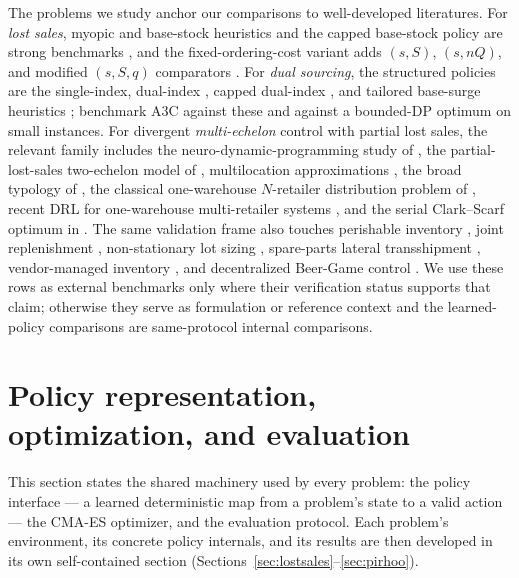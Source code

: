 \documentclass[11pt]{article}
\begin{document}
The problems we study anchor our comparisons to well-developed literatures. For \emph{lost sales},
myopic and base-stock heuristics and the capped base-stock policy are strong benchmarks
\citep{Zipkin2008OldSystems,Xin2021CappedBaseStock}, and the fixed-ordering-cost variant adds
$(s,S)$, $(s,nQ)$, and modified $(s,S,q)$ comparators \citep{Bijvank2015ParametricPolicies}. For
\emph{dual sourcing}, the structured policies are the single-index, dual-index
\citep{veeraraghavan2008dualindex}, capped dual-index \citep{sun2019cappeddualindex}, and tailored base-surge heuristics
\citep{sheopuri2010dualsourcing}; \citet{gijsbrechts2022drl} benchmark A3C against these and against a
bounded-DP optimum on small instances. For divergent \emph{multi-echelon} control with partial lost
sales, the relevant family includes the neuro-dynamic-programming study of \citet{vanroy1997ndp}, the
partial-lost-sales two-echelon model of \citet{nahmias1994partial}, multilocation approximations
\citep{federgruen1984multilocation}, the broad typology of \citet{dekok2018typology}, the classical one-warehouse $N$-retailer
distribution problem of \citet{schwarz1973owmr}, recent DRL for one-warehouse multi-retailer systems
\citep{kaynov2024owmr}, and the serial Clark--Scarf optimum in \citet{snyder2019foundations}. The
same validation frame also touches perishable inventory \citep{deMoor2022perishable,farrington2025perishable},
joint replenishment \citep{vanvuchelen2020jrp}, non-stationary lot sizing
\citep{dehaybe2024nonstationary}, spare-parts lateral transshipment
\citep{kranenburg2006spares}, vendor-managed inventory \citep{sui2010vmi}, and decentralized
Beer-Game control \citep{sterman1989beer,edali2014beer}. We use these rows as external benchmarks
only where their verification status supports that claim; otherwise they serve as formulation or
reference context and the learned-policy comparisons are same-protocol internal comparisons.

\section{Policy representation, optimization, and evaluation}
\label{sec:methods}

This section states the shared machinery used by every problem: the policy interface --- a learned
deterministic map from a problem's state to a valid action --- the CMA-ES optimizer, and the
evaluation protocol. Each problem's environment, its concrete policy internals, and its results are
then developed in its own self-contained section (Sections~\ref{sec:lostsales}--\ref{sec:pirhoo}).
\end{document}
